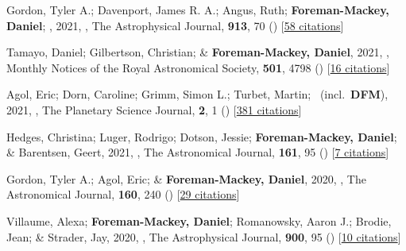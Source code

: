 \item[{\color{numcolor}\scriptsize64}] Gordon, Tyler A.; Davenport, James R. A.; Angus, Ruth; \textbf{Foreman-Mackey, Daniel}; \etal, 2021, , The Astrophysical Journal, \textbf{913}, 70 () [\href{https://ui.adsabs.harvard.edu/abs/2021ApJ...913...70G}{58 citations}]

\item[{\color{numcolor}\scriptsize63}] Tamayo, Daniel; Gilbertson, Christian; \& \textbf{Foreman-Mackey, Daniel}, 2021, , Monthly Notices of the Royal Astronomical Society, \textbf{501}, 4798 () [\href{https://ui.adsabs.harvard.edu/abs/2021MNRAS.501.4798T}{16 citations}]

\item[{\color{numcolor}\scriptsize62}] Agol, Eric; Dorn, Caroline; Grimm, Simon L.; Turbet, Martin; \etal\ (incl.\ \textbf{DFM}), 2021, , The Planetary Science Journal, \textbf{2}, 1 () [\href{https://ui.adsabs.harvard.edu/abs/2021PSJ.....2....1A}{381 citations}]

\item[{\color{numcolor}\scriptsize61}] Hedges, Christina; Luger, Rodrigo; Dotson, Jessie; \textbf{Foreman-Mackey, Daniel}; \& Barentsen, Geert, 2021, , The Astronomical Journal, \textbf{161}, 95 () [\href{https://ui.adsabs.harvard.edu/abs/2021AJ....161...95H}{7 citations}]

\item[{\color{numcolor}\scriptsize60}] Gordon, Tyler A.; Agol, Eric; \& \textbf{Foreman-Mackey, Daniel}, 2020, , The Astronomical Journal, \textbf{160}, 240 () [\href{https://ui.adsabs.harvard.edu/abs/2020AJ....160..240G}{29 citations}]

\item[{\color{numcolor}\scriptsize59}] Villaume, Alexa; \textbf{Foreman-Mackey, Daniel}; Romanowsky, Aaron J.; Brodie, Jean; \& Strader, Jay, 2020, , The Astrophysical Journal, \textbf{900}, 95 () [\href{https://ui.adsabs.harvard.edu/abs/2020ApJ...900...95V}{10 citations}]

